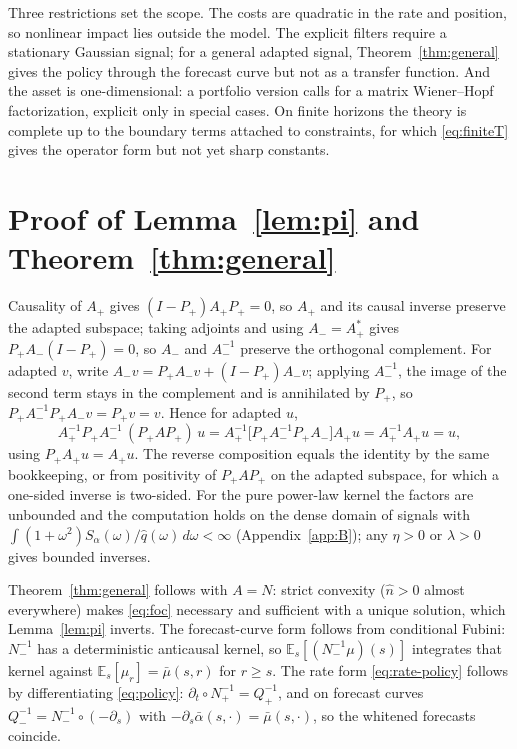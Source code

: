 \documentclass[11pt]{article}
\newcommand{\E}{\mathbb{E}}
\theoremstyle{plain}
\theoremstyle{definition}
\theoremstyle{remark}
\begin{document}
Three restrictions set the scope. The costs are quadratic in the rate and position, so nonlinear impact lies outside the model. The explicit filters require a stationary Gaussian signal; for a general adapted signal, Theorem~\ref{thm:general} gives the policy through the forecast curve but not as a transfer function. And the asset is one-dimensional: a portfolio version calls for a matrix Wiener--Hopf factorization, explicit only in special cases. On finite horizons the theory is complete up to the boundary terms attached to constraints, for which \eqref{eq:finiteT} gives the operator form but not yet sharp constants.

\appendix

\section{Proof of Lemma~\ref{lem:pi} and Theorem~\ref{thm:general}}\label{app:A}
Causality of $A_+$ gives $(I-P_+)A_+P_+=0$, so $A_+$ and its causal inverse preserve the adapted subspace; taking adjoints and using $A_-=A_+^*$ gives $P_+A_-(I-P_+)=0$, so $A_-$ and $A_-^{-1}$ preserve the orthogonal complement. For adapted $v$, write $A_-v=P_+A_-v+(I-P_+)A_-v$; applying $A_-^{-1}$, the image of the second term stays in the complement and is annihilated by $P_+$, so $P_+A_-^{-1}P_+A_-v=P_+v=v$. Hence for adapted $u$,
\[
A_+^{-1}P_+A_-^{-1}\,(P_+AP_+)\,u = A_+^{-1}\bigl[P_+A_-^{-1}P_+A_-\bigr]A_+u = A_+^{-1}A_+u = u,
\]
using $P_+A_+u=A_+u$. The reverse composition equals the identity by the same bookkeeping, or from positivity of $P_+AP_+$ on the adapted subspace, for which a one-sided inverse is two-sided. For the pure power-law kernel the factors are unbounded and the computation holds on the dense domain of signals with $\int(1+\omega^2)S_\alpha(\omega)/\hat q(\omega)\,d\omega<\infty$ (Appendix~\ref{app:B}); any $\eta>0$ or $\lambda>0$ gives bounded inverses.

Theorem~\ref{thm:general} follows with $A=N$: strict convexity ($\hat n>0$ almost everywhere) makes \eqref{eq:foc} necessary and sufficient with a unique solution, which Lemma~\ref{lem:pi} inverts. The forecast-curve form follows from conditional Fubini: $N_-^{-1}$ has a deterministic anticausal kernel, so $\E_s[(N_-^{-1}\mu)(s)]$ integrates that kernel against $\E_s[\mu_r]=\bar\mu(s,r)$ for $r\ge s$. The rate form \eqref{eq:rate-policy} follows by differentiating \eqref{eq:policy}: $\partial_t\circ N_+^{-1}=Q_+^{-1}$, and on forecast curves $Q_-^{-1}=N_-^{-1}\circ(-\partial_s)$ with $-\partial_s\bar\alpha(s,\cdot)=\bar\mu(s,\cdot)$, so the whitened forecasts coincide.
\end{document}
